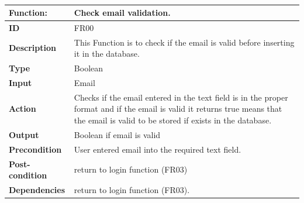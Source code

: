 \documentclass[]{article}
\begin{document}
\FloatBarrier
\begin{table}[h]
\caption{ }
\label{tab:my-table}
\begin{tabular}{|p{}|p{}|}
\hline
\textbf{Function:} & Check email validation.
\\ \hline
\textbf{ID}  &      FR00      

\\ \hline
\textbf{Description}    &    This Function is to check if the email is valid before inserting it in the database.                                                                 
\\ \hline
\textbf{Type}    &         Boolean

\\ \hline
\textbf{Input}        & Email


\\ \hline
\textbf{Action}            & Checks if the email entered in the text field  is in the proper format and  if the email is valid  it returns true means that the email is valid to be stored if exists in the database.

\\ \hline
\textbf{Output}            & Boolean if email is valid

\\ \hline
\textbf{Precondition}           &   User entered email into the required text field.

\\ \hline
\textbf{Post-condition}          & return to login function (FR03)  


\\ \hline
\textbf{Dependencies}           & return to login function (FR03).
\\ \hline
\end{tabular}
\end{table}
\end{document}
